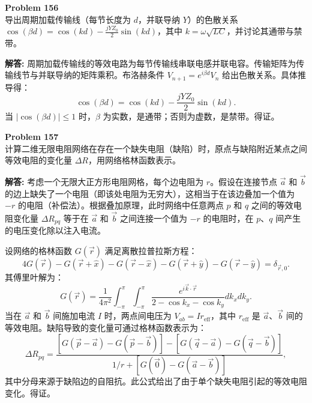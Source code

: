 \documentclass[12pt, a4paper, oneside]{ctexart}
\newenvironment{solution}{\par\noindent\textbf{解答:}\quad}{\par}
\begin{document}
\begin{mdframed}[backgroundcolor=gray!10, linewidth=0pt]
    \textbf{Problem 156} \\
    导出周期加载传输线（每节长度为 $d$，并联导纳 $Y$）的色散关系 $\cos(\beta d) = \cos(k d) - \frac{j Y Z_0}{2} \sin(k d)$，其中 $k = \omega \sqrt{LC}$，并讨论其通带与禁带。
\end{mdframed}
\begin{solution}
    周期加载传输线的等效电路为每节传输线串联电感并联电容。传输矩阵为传输线节与并联导纳的矩阵乘积。布洛赫条件 $V_{n+1} = e^{i\beta d} V_n$ 给出色散关系。具体推导得：
    \[
    \cos(\beta d) = \cos(k d) - \frac{j Y Z_0}{2} \sin(k d).
    \]
    当 $|\cos(\beta d)| \le 1$ 时，$\beta$ 为实数，是通带；否则为虚数，是禁带。得证。
\end{solution}

\begin{mdframed}[backgroundcolor=gray!10, linewidth=0pt]
    \textbf{Problem 157} \\
    计算二维无限电阻网络在存在一个缺失电阻（缺陷）时，原点与缺陷附近某点之间等效电阻的变化量 $\Delta R$，用网络格林函数表示。
\end{mdframed}
\begin{solution}
    考虑一个无限大正方形电阻网格，每个边电阻为 $r$。假设在连接节点 $\vec{a}$ 和 $\vec{b}$ 的边上缺失了一个电阻（即该处电阻为无穷大），这相当于在该边叠加一个值为 $-r$ 的电阻（补偿法）。根据叠加原理，此时网络中任意两点 $p$ 和 $q$ 之间的等效电阻变化量 $\Delta R_{pq}$ 等于在 $\vec{a}$ 和 $\vec{b}$ 之间连接一个值为 $-r$ 的电阻时，在 $p$、$q$ 间产生的电压变化除以注入电流。

    设网络的格林函数 $G(\vec{r})$ 满足离散拉普拉斯方程：
    \[
    4G(\vec{r}) - G(\vec{r}+\hat{x}) - G(\vec{r}-\hat{x}) - G(\vec{r}+\hat{y}) - G(\vec{r}-\hat{y}) = \delta_{\vec{r},0}.
    \]
    其傅里叶解为：
    \[
    G(\vec{r}) = \frac{1}{4\pi^2} \int_{-\pi}^{\pi} \int_{-\pi}^{\pi} \frac{e^{i\vec{k}\cdot\vec{r}}}{2 - \cos k_x - \cos k_y} dk_x dk_y.
    \]
    当在 $\vec{a}$ 和 $\vec{b}$ 间施加电流 $I$ 时，两点间电压为 $V_{ab} = I r_{\text{eff}}$，其中 $r_{\text{eff}}$ 是 $\vec{a}$、$\vec{b}$ 间的等效电阻。缺陷导致的变化量可通过格林函数表示为：
    \[
    \Delta R_{pq} = \frac{[G(\vec{p} - \vec{a}) - G(\vec{p} - \vec{b})] - [G(\vec{q} - \vec{a}) - G(\vec{q} - \vec{b})]}{1/r + [G(\vec{0}) - G(\vec{a}-\vec{b})]},
    \]
    其中分母来源于缺陷边的自阻抗。此公式给出了由于单个缺失电阻引起的等效电阻变化。得证。
\end{solution}
\end{document}
